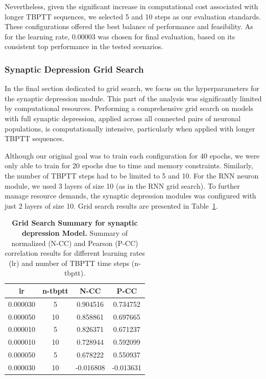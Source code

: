 Nevertheless, given the significant increase in computational cost associated with longer TBPTT sequences, we selected 5 and 10 steps as our evaluation standards. These configurations offered the best balance of performance and feasibility. As for the learning rate, 0.00003 was chosen for final evaluation, based on its consistent top performance in the tested scenarios.

\subsubsection{Synaptic Depression Grid Search}
\label{subsubsec:synaptic_depression_grid_search}
In the final section dedicated to grid search, we focus on the hyperparameters for the synaptic depression module. This part of the analysis was significantly limited by computational resources. Performing a comprehensive grid search on models with full synaptic depression, applied across all connected pairs of neuronal populations, is computationally intensive, particularly when applied with longer TBPTT sequences.

Although our original goal was to train each configuration for 40 epochs, we were only able to train for 20 epochs due to time and memory constraints. Similarly, the number of TBPTT steps had to be limited to 5 and 10. For the RNN neuron module, we used 3 layers of size 10 (as in the RNN grid search). To further manage resource demands, the synaptic depression modules was configured with just 2 layers of size 10. Grid search results are presented in Table~\ref{tab:grid_synaptic_adaptation}.

\begin{table}
    \centering\footnotesize\sf
    \begin{tabular}{cccc}
    \toprule
    lr & n-tbptt & N-CC & P-CC \\
    \midrule
    0.000030 & 5 & 0.904516 & 0.734752 \\
    0.000050 & 10 & 0.858861 & 0.697665 \\
    0.000010 & 5 & 0.826371 & 0.671237 \\
    0.000010 & 10 & 0.728944 & 0.592099 \\
    0.000050 & 5 & 0.678222 & 0.550937 \\
    0.000030 & 10 & -0.016808 & -0.013631 \\
    \bottomrule
    \end{tabular}
    \caption{\textbf{Grid Search Summary for synaptic depression Model.} Summary of normalized (N-CC) and Pearson (P-CC) correlation results for different learning rates (lr) and number of TBPTT time steps (n-tbptt).}
    \label{tab:grid_synaptic_adaptation}
\end{table}

